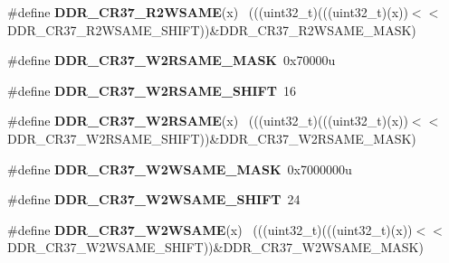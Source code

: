 \begin{DoxyCompactItemize}
\item 
\hypertarget{group___d_d_r___register___masks_ga586cfee4e22ff2c446002692f915421f}{}\#define {\bfseries D\+D\+R\+\_\+\+C\+R37\+\_\+\+R2\+W\+S\+A\+M\+E}(x)                                        ~(((uint32\+\_\+t)(((uint32\+\_\+t)(x))$<$$<$D\+D\+R\+\_\+\+C\+R37\+\_\+\+R2\+W\+S\+A\+M\+E\+\_\+\+S\+H\+I\+F\+T))\&D\+D\+R\+\_\+\+C\+R37\+\_\+\+R2\+W\+S\+A\+M\+E\+\_\+\+M\+A\+S\+K)\label{group___d_d_r___register___masks_ga586cfee4e22ff2c446002692f915421f}

\item 
\hypertarget{group___d_d_r___register___masks_gacf8a7702fbc19927689f996bbe8a8220}{}\#define {\bfseries D\+D\+R\+\_\+\+C\+R37\+\_\+\+W2\+R\+S\+A\+M\+E\+\_\+\+M\+A\+S\+K}~0x70000u\label{group___d_d_r___register___masks_gacf8a7702fbc19927689f996bbe8a8220}

\item 
\hypertarget{group___d_d_r___register___masks_gaacc0a1c4d5d50b546f9af16847cb2ef9}{}\#define {\bfseries D\+D\+R\+\_\+\+C\+R37\+\_\+\+W2\+R\+S\+A\+M\+E\+\_\+\+S\+H\+I\+F\+T}~16\label{group___d_d_r___register___masks_gaacc0a1c4d5d50b546f9af16847cb2ef9}

\item 
\hypertarget{group___d_d_r___register___masks_ga67196339d98f12c1ff1f95e72da1757d}{}\#define {\bfseries D\+D\+R\+\_\+\+C\+R37\+\_\+\+W2\+R\+S\+A\+M\+E}(x)                                        ~(((uint32\+\_\+t)(((uint32\+\_\+t)(x))$<$$<$D\+D\+R\+\_\+\+C\+R37\+\_\+\+W2\+R\+S\+A\+M\+E\+\_\+\+S\+H\+I\+F\+T))\&D\+D\+R\+\_\+\+C\+R37\+\_\+\+W2\+R\+S\+A\+M\+E\+\_\+\+M\+A\+S\+K)\label{group___d_d_r___register___masks_ga67196339d98f12c1ff1f95e72da1757d}

\item 
\hypertarget{group___d_d_r___register___masks_ga1196dd1108210144ac7b52b7e678a597}{}\#define {\bfseries D\+D\+R\+\_\+\+C\+R37\+\_\+\+W2\+W\+S\+A\+M\+E\+\_\+\+M\+A\+S\+K}~0x7000000u\label{group___d_d_r___register___masks_ga1196dd1108210144ac7b52b7e678a597}

\item 
\hypertarget{group___d_d_r___register___masks_ga64c424d6c617d41e7376832d3081cb16}{}\#define {\bfseries D\+D\+R\+\_\+\+C\+R37\+\_\+\+W2\+W\+S\+A\+M\+E\+\_\+\+S\+H\+I\+F\+T}~24\label{group___d_d_r___register___masks_ga64c424d6c617d41e7376832d3081cb16}

\item 
\hypertarget{group___d_d_r___register___masks_gaee442625a39244dc5a357451114c50ce}{}\#define {\bfseries D\+D\+R\+\_\+\+C\+R37\+\_\+\+W2\+W\+S\+A\+M\+E}(x)                                        ~(((uint32\+\_\+t)(((uint32\+\_\+t)(x))$<$$<$D\+D\+R\+\_\+\+C\+R37\+\_\+\+W2\+W\+S\+A\+M\+E\+\_\+\+S\+H\+I\+F\+T))\&D\+D\+R\+\_\+\+C\+R37\+\_\+\+W2\+W\+S\+A\+M\+E\+\_\+\+M\+A\+S\+K)\label{group___d_d_r___register___masks_gaee442625a39244dc5a357451114c50ce}


\end{DoxyCompactItemize}
